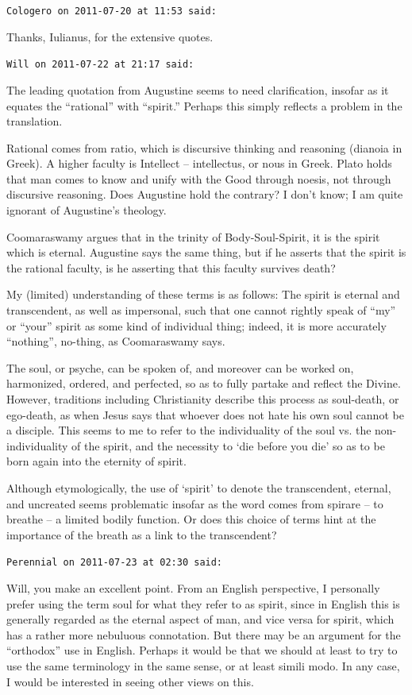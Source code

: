 \begin{footnotesize}
\begin{sffamily}
\hfill

\texttt{Cologero on 2011-07-20 at 11:53 said: }

Thanks, Iulianus, for the extensive quotes.

\hfill

\texttt{Will on 2011-07-22 at 21:17 said: }

The leading quotation from Augustine seems to need clarification, insofar as it equates the “rational” with “spirit.” Perhaps this simply reflects a problem in the translation.

Rational comes from ratio, which is discursive thinking and reasoning (dianoia in Greek). A higher faculty is Intellect – intellectus, or nous in Greek. Plato holds that man comes to know and unify with the Good through noesis, not through discursive reasoning. Does Augustine hold the contrary? I don't know; I am quite ignorant of Augustine's theology.

Coomaraswamy argues that in the trinity of Body-Soul-Spirit, it is the spirit which is eternal. Augustine says the same thing, but if he asserts that the spirit is the rational faculty, is he asserting that this faculty survives death?

My (limited) understanding of these terms is as follows: The spirit is eternal and transcendent, as well as impersonal, such that one cannot rightly speak of “my” or “your” spirit as some kind of individual thing; indeed, it is more accurately “nothing”, no-thing, as Coomaraswamy says. 

The soul, or psyche, can be spoken of, and moreover can be worked on, harmonized, ordered, and perfected, so as to fully partake and reflect the Divine. However, traditions including Christianity describe this process as soul-death, or ego-death, as when Jesus says that whoever does not hate his own soul cannot be a disciple. This seems to me to refer to the individuality of the soul vs. the non-individuality of the spirit, and the necessity to `die before you die' so as to be born again into the eternity of spirit.

Although etymologically, the use of `spirit' to denote the transcendent, eternal, and uncreated seems problematic insofar as the word comes from spirare – to breathe – a limited bodily function. Or does this choice of terms hint at the importance of the breath as a link to the transcendent?

\hfill

\texttt{Perennial on 2011-07-23 at 02:30 said: }

Will, you make an excellent point. From an English perspective, I personally prefer using the term soul for what they refer to as spirit, since in English this is generally regarded as the eternal aspect of man, and vice versa for spirit, which has a rather more nebuluous connotation. But there may be an argument for the “orthodox” use in English. Perhaps it would be that we should at least to try to use the same terminology in the same sense, or at least simili modo. In any case, I would be interested in seeing other views on this.

\end{sffamily}\end{footnotesize}
